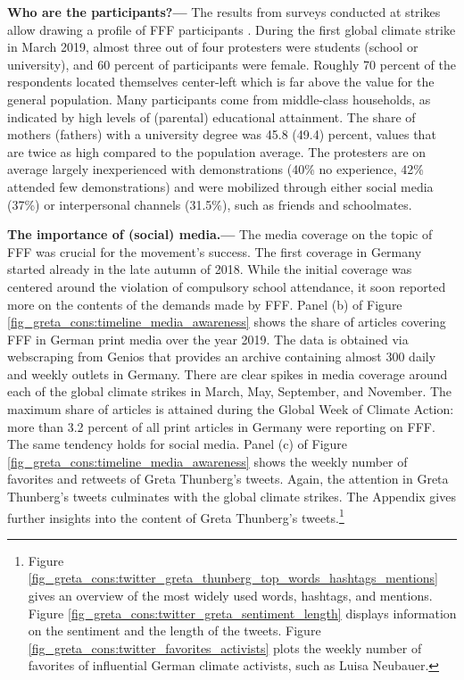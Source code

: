 \textbf{Who are the participants?---} The results from surveys conducted at strikes allow drawing a profile of FFF participants \citep{sommer2019fridays,demoor2020protest}. During the first global climate strike in March 2019, almost three out of four protesters were students (school or university), and 60 percent of participants were female. Roughly 70 percent of the respondents located themselves center-left which is far above the value for the general population. Many participants come from middle-class households, as indicated by high levels of (parental) educational attainment. The share of mothers (fathers) with a university degree was 45.8 (49.4) percent, values that are twice as high compared to the population average. The protesters are on average largely inexperienced with demonstrations (40\% no experience, 42\% attended few demonstrations) and were mobilized through either social media (37\%) or interpersonal channels (31.5\%), such as friends and schoolmates.




\textbf{The importance of (social) media.---} The media coverage on the topic of FFF was crucial for the movement's success. The first coverage in Germany started already in the late autumn of 2018.
While the initial coverage was centered around the violation of compulsory school attendance, it soon reported more on the contents of the demands made by FFF. Panel (b) of Figure \ref{fig_greta_cons:timeline_media_awareness} shows the share of articles covering FFF in German print media over the year 2019. The data is obtained via webscraping from Genios that provides an archive containing almost 300 daily and weekly outlets in Germany. There are clear spikes in media coverage around each of the global climate strikes in March, May, September, and November. The maximum share of articles is attained during the Global Week of Climate Action: more than 3.2 percent of all print articles in Germany were reporting on FFF. The same tendency holds for social media. Panel (c) of Figure \ref{fig_greta_cons:timeline_media_awareness} shows the weekly number of favorites and retweets of Greta Thunberg's tweets. Again, the attention in Greta Thunberg's tweets culminates with the global climate strikes. The Appendix gives further insights into the content of Greta Thunberg's tweets.\footnote{Figure \ref{fig_greta_cons:twitter_greta_thunberg_top_words_hashtags_mentions} gives an overview of the most widely used words, hashtags, and mentions. Figure \ref{fig_greta_cons:twitter_greta_sentiment_length} displays information on the sentiment and the length of the tweets. Figure \ref{fig_greta_cons:twitter_favorites_activists} plots the weekly number of favorites of influential German climate activists, such as Luisa Neubauer.}



